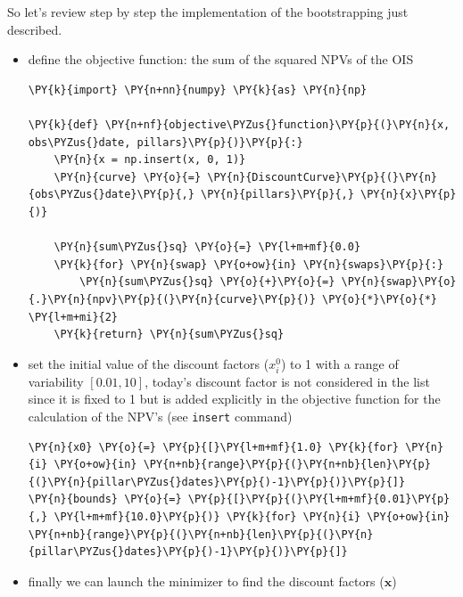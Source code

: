 So let's review step by step the implementation of the bootstrapping just described.

\begin{itemize}
\tightlist
\item
  define the objective function: the sum of the squared NPVs of the OIS

\begin{codebox}
\begin{Verbatim}[commandchars=\\\{\}]
\PY{k}{import} \PY{n+nn}{numpy} \PY{k}{as} \PY{n}{np}

\PY{k}{def} \PY{n+nf}{objective\PYZus{}function}\PY{p}{(}\PY{n}{x, obs\PYZus{}date, pillars}\PY{p}{)}\PY{p}{:}
    \PY{n}{x = np.insert(x, 0, 1)}
    \PY{n}{curve} \PY{o}{=} \PY{n}{DiscountCurve}\PY{p}{(}\PY{n}{obs\PYZus{}date}\PY{p}{,} \PY{n}{pillars}\PY{p}{,} \PY{n}{x}\PY{p}{)}
    
    \PY{n}{sum\PYZus{}sq} \PY{o}{=} \PY{l+m+mf}{0.0}
    \PY{k}{for} \PY{n}{swap} \PY{o+ow}{in} \PY{n}{swaps}\PY{p}{:}
        \PY{n}{sum\PYZus{}sq} \PY{o}{+}\PY{o}{=} \PY{n}{swap}\PY{o}{.}\PY{n}{npv}\PY{p}{(}\PY{n}{curve}\PY{p}{)} \PY{o}{*}\PY{o}{*} \PY{l+m+mi}{2}
    \PY{k}{return} \PY{n}{sum\PYZus{}sq}
\end{Verbatim}
\end{codebox}

\item
  set the initial value of the discount factors (\(x_i^0\)) to 1 with a
  range of variability \([ 0.01, 10]\), today's discount factor is not considered 
  in the list since it is fixed to 1 but is added explicitly in the objective function
  for the calculation of the NPV's (see \texttt{insert} command)

\begin{codebox}
\begin{Verbatim}[commandchars=\\\{\}]
\PY{n}{x0} \PY{o}{=} \PY{p}{[}\PY{l+m+mf}{1.0} \PY{k}{for} \PY{n}{i} \PY{o+ow}{in} \PY{n+nb}{range}\PY{p}{(}\PY{n+nb}{len}\PY{p}{(}\PY{n}{pillar\PYZus{}dates}\PY{p}{)-1}\PY{p}{)}\PY{p}{]}
\PY{n}{bounds} \PY{o}{=} \PY{p}{[}\PY{p}{(}\PY{l+m+mf}{0.01}\PY{p}{,} \PY{l+m+mf}{10.0}\PY{p}{)} \PY{k}{for} \PY{n}{i} \PY{o+ow}{in} \PY{n+nb}{range}\PY{p}{(}\PY{n+nb}{len}\PY{p}{(}\PY{n}{pillar\PYZus{}dates}\PY{p}{)-1}\PY{p}{)}\PY{p}{]}
\end{Verbatim}
\end{codebox}

\item
  finally we can launch the minimizer to find the discount factors
  (\(\mathbf{x}\))


\end{itemize}
